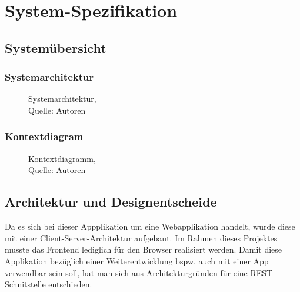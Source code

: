 \section{System-Spezifikation}\label{SystemSpezifikation}
\subsection{Systemübersicht}
\subsubsection{Systemarchitektur}
\begin{figure}[H]
    \centering
    \caption[Systemarchitektur]{Systemarchitektur,\\ Quelle: Autoren}
    \label{img: Systemarchitektur des Projektes}
\end{figure}
\newpage
\subsubsection{Kontextdiagram}\label{Kontextdiagram}
\begin{figure}[H]
    \centering
    \caption[Kontextdiagramm]{Kontextdiagramm,\\ Quelle: Autoren}
    \label{img: Kontextdiagramm des Projektes}
\end{figure}
\newpage


\newpage
\subsection{Architektur und Designentscheide}
Da es sich bei dieser Appplikation um eine Webapplikation handelt, wurde diese mit einer Client-Server-Architektur aufgebaut. Im Rahmen dieses Projektes musste das Frontend lediglich für den Browser realisiert werden. Damit diese Applikation bezüglich einer Weiterentwicklung bspw. auch mit einer App verwendbar sein soll, hat man sich aus Architekturgründen für eine REST-Schnitstelle entschieden.

